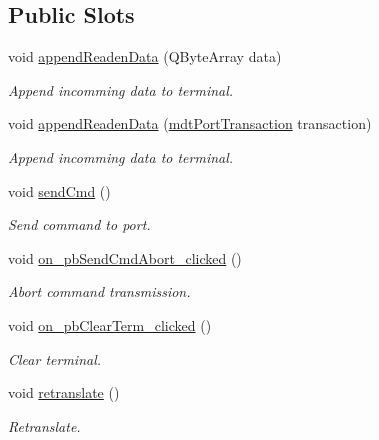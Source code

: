 \subsection*{Public Slots}
\begin{DoxyCompactItemize}
\item 
\hypertarget{classmdt_port_term_a2372dc6e8f2926f2201b659ddbe3ec8e}{
void \hyperlink{classmdt_port_term_a2372dc6e8f2926f2201b659ddbe3ec8e}{appendReadenData} (QByteArray data)}
\label{classmdt_port_term_a2372dc6e8f2926f2201b659ddbe3ec8e}

\begin{DoxyCompactList}\small\item\em Append incomming data to terminal. \end{DoxyCompactList}\item 
\hypertarget{classmdt_port_term_a70ab65c029f82063a79734bb91e1fd32}{
void \hyperlink{classmdt_port_term_a70ab65c029f82063a79734bb91e1fd32}{appendReadenData} (\hyperlink{classmdt_port_transaction}{mdtPortTransaction} transaction)}
\label{classmdt_port_term_a70ab65c029f82063a79734bb91e1fd32}

\begin{DoxyCompactList}\small\item\em Append incomming data to terminal. \end{DoxyCompactList}\item 
\hypertarget{classmdt_port_term_a7ec568c44f862fe7aee83f1a271ac6bb}{
void \hyperlink{classmdt_port_term_a7ec568c44f862fe7aee83f1a271ac6bb}{sendCmd} ()}
\label{classmdt_port_term_a7ec568c44f862fe7aee83f1a271ac6bb}

\begin{DoxyCompactList}\small\item\em Send command to port. \end{DoxyCompactList}\item 
\hypertarget{classmdt_port_term_a1b232e686b401d7103eb1c682be330a9}{
void \hyperlink{classmdt_port_term_a1b232e686b401d7103eb1c682be330a9}{on\_\-pbSendCmdAbort\_\-clicked} ()}
\label{classmdt_port_term_a1b232e686b401d7103eb1c682be330a9}

\begin{DoxyCompactList}\small\item\em Abort command transmission. \end{DoxyCompactList}\item 
\hypertarget{classmdt_port_term_abb3fc55837782dbea240b069a48b18ce}{
void \hyperlink{classmdt_port_term_abb3fc55837782dbea240b069a48b18ce}{on\_\-pbClearTerm\_\-clicked} ()}
\label{classmdt_port_term_abb3fc55837782dbea240b069a48b18ce}

\begin{DoxyCompactList}\small\item\em Clear terminal. \end{DoxyCompactList}\item 
void \hyperlink{classmdt_port_term_a542e20f789bcdc5f2ddf2b6e698ceea2}{retranslate} ()
\begin{DoxyCompactList}\small\item\em Retranslate. \end{DoxyCompactList}\end{DoxyCompactItemize}
